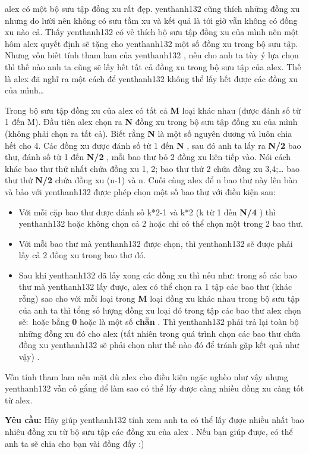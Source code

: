 alex   có một bộ sưu tập đồng xu rất đẹp.   yenthanh132   cũng thích những đồng xu nhưng do lười nên không có sưu tầm xu và kết quả là tới giờ vẫn không có đồng xu nào cả. Thấy   yenthanh132   có vẻ thích bộ sưu tập đồng xu của mình nên một hôm   alex   quyết định sẽ tặng cho   yenthanh132   một số đồng xu trong bộ sưu tập. Nhưng vốn biết tính tham lam của   yenthanh132   , nếu cho anh ta tùy ý lựa chọn thì thế nào anh ta cũng sẽ lấy hết tất cả đồng xu trong bộ sưu tập của   alex.   Thế là   alex   đã nghĩ ra một cách để   yenthanh132   không thể lấy hết được các đồng xu của mình…  

   Trong bộ sưu tập đồng xu của   alex   có tất cả   \textbf{    M   }   loại khác nhau (được đánh số từ 1 đến M). Đầu tiên   alex   chọn ra   \textbf{    N   }   đồng xu trong bộ sưu tập đồng xu của mình (không phải chọn ra tất cả). Biết rằng   \textbf{    N   }   là một số nguyên dương và luôn chia hết cho 4. Các đồng xu được đánh số từ 1 đến   \textbf{    N   }   , sau đó anh ta lấy ra   \textbf{    N/2   }   bao thư, đánh số từ 1 đến   \textbf{    N/2   }   , mỗi bao thư bỏ 2 đồng xu liên tiếp vào. Nói cách khác bao thư thứ nhất chứa đồng xu 1, 2; bao thư thứ 2 chứa đồng xu 3,4;… bao thư thứ   \textbf{    N/2   }   chứa đồng xu (n-1) và n. Cuối cùng   alex   để n bao thư này lên bàn và bảo với   yenthanh132   được phép chọn một số bao thư với điều kiện sau:  
\begin{itemize}
	\item     Với mỗi cặp bao thư được đánh số k*2-1 và k*2 (k từ 1 đến    \textbf{     N/4    }    ) thì    yenthanh132    hoặc không chọn cả 2 hoặc chỉ có thể chọn một trong 2 bao thư.   
	\item     Với mỗi bao thư mà    yenthanh132    được chọn, thì    yenthanh132    sẽ được phải lấy cả 2 đồng xu trong bao thơ đó.   
	\item     Sau khi    yenthanh132    đã lấy xong các đồng xu thì nếu như: trong số các bao thư mà    yenthanh132    lấy được,    alex    có thể chọn ra 1 tập các bao thư (khác rỗng) sao cho với mỗi loại trong    \textbf{     M    }    loại đồng xu khác nhau trong bộ sưu tập của anh ta thì tổng số lượng đồng xu loại đó trong tập các bao thư    alex    chọn sẽ: hoặc bằng    \textbf{     0    }    hoặc là một số    \textbf{     chẵn    }    . Thì    yenthanh132    phải trả lại toàn bộ những đồng xu đó cho    alex    (tất nhiên trong quá trình chọn các bao thư chứa đồng xu    yenthanh132    sẽ phải chọn như thế nào đó để tránh gặp kết quả như vậy)    .
\end{itemize}

   Vốn tính tham lam nên mặt dù   alex   cho điều kiện ngặc nghèo như vậy nhưng   yenthanh132   vẫn cố gắng để làm sao có thể lấy được càng nhiều đồng xu càng tốt từ   alex.

\textbf{    Yêu cầu:   }   Hãy giúp   yenthanh132   tính xem anh ta có thể lấy được nhiều nhất bao nhiêu đồng xu từ bộ sưu tập các đồng xu của   alex   . Nếu bạn giúp được, có thể anh ta sẽ chia cho bạn vài đồng đấy :)